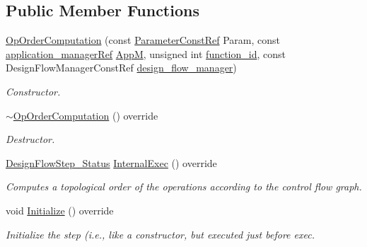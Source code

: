 \subsection*{Public Member Functions}
\begin{DoxyCompactItemize}
\item 
\hyperlink{classOpOrderComputation_a5805bb8f1921664144270677bbcf9b5f}{Op\+Order\+Computation} (const \hyperlink{Parameter_8hpp_a37841774a6fcb479b597fdf8955eb4ea}{Parameter\+Const\+Ref} Param, const \hyperlink{application__manager_8hpp_a04ccad4e5ee401e8934306672082c180}{application\+\_\+manager\+Ref} \hyperlink{classFrontendFlowStep_a0ac0d8db2a378416583f51c4faa59d15}{AppM}, unsigned int \hyperlink{classFunctionFrontendFlowStep_a58ef2383ad1a212a8d3f396625a4b616}{function\+\_\+id}, const Design\+Flow\+Manager\+Const\+Ref \hyperlink{classDesignFlowStep_ab770677ddf087613add30024e16a5554}{design\+\_\+flow\+\_\+manager})
\begin{DoxyCompactList}\small\item\em Constructor. \end{DoxyCompactList}\item 
\hyperlink{classOpOrderComputation_a687f897e757aeb13b59458bf3460dd73}{$\sim$\+Op\+Order\+Computation} () override
\begin{DoxyCompactList}\small\item\em Destructor. \end{DoxyCompactList}\item 
\hyperlink{design__flow__step_8hpp_afb1f0d73069c26076b8d31dbc8ebecdf}{Design\+Flow\+Step\+\_\+\+Status} \hyperlink{classOpOrderComputation_a9d0944110ff2b9f699c1390db8f22650}{Internal\+Exec} () override
\begin{DoxyCompactList}\small\item\em Computes a topological order of the operations according to the control flow graph. \end{DoxyCompactList}\item 
void \hyperlink{classOpOrderComputation_a188a6be8efc8b80fd9ed85c19ceac824}{Initialize} () override
\begin{DoxyCompactList}\small\item\em Initialize the step (i.\+e., like a constructor, but executed just before exec. \end{DoxyCompactList}\end{DoxyCompactItemize}
